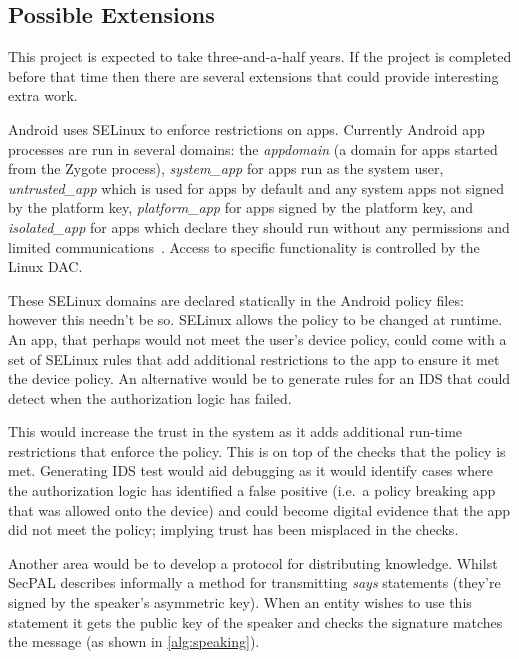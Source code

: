 \documentclass[a4paper,sfsidenotes]{%
  scrartcl%
}
\begin{document}
\subsection{Possible Extensions}

This project is expected to take three-and-a-half years. If the project is
completed before that time then there are several extensions that could provide
interesting extra work.

Android uses SELinux to enforce restrictions on apps.  Currently Android app
processes are run in several domains: the \emph{appdomain} (a domain for apps
started from the Zygote process), \emph{system\_app} for apps run as the system
user, \emph{untrusted\_app} which is used for apps by default and any system
apps not signed by the platform key, \emph{platform\_app} for apps signed by the
platform key, and \emph{isolated\_app} for apps which declare they should run
without any permissions and limited communications~\cite{google:sepolicy}.
Access to specific functionality is controlled by the Linux \ac{DAC}.

These SELinux domains are declared statically in the Android policy files:
however this needn't be so.  SELinux allows the policy to be changed at runtime.
An app, that perhaps would not meet the user's device policy, could come with a
set of SELinux rules that add additional restrictions to the app to ensure it
met the device policy.  An alternative would be to generate rules for an
\ac{IDS} that could detect when the authorization logic has failed.

This would increase the trust in the system as it adds additional run-time
restrictions that enforce the policy.  This is on top of the checks that the policy is
met.  Generating \ac{IDS} test would aid debugging as it would identify cases
where the authorization logic has identified a false positive (i.e.~a policy
breaking app that was allowed onto the device) and could become digital evidence
that the app did not meet the policy; implying trust has been misplaced in the
checks.

Another area would be to develop a protocol for distributing knowledge.  
Whilst SecPAL describes informally a method for transmitting \emph{says}
statements (they're signed by the speaker's asymmetric key).  When an entity
wishes to use this statement it gets the public key of the speaker and checks
the signature matches the message (as shown in \autoref{alg:speaking}).  
\end{document}
